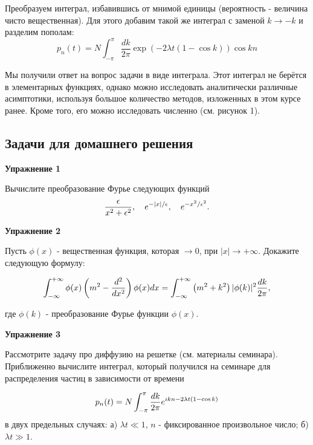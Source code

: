 \documentclass[a4paper,12pt]{article}
\begin{document}
\noindent
Преобразуем интеграл, избавившись от мнимой единицы (вероятность -
величина чисто вещественная). Для этого добавим такой же интеграл
с заменой $k\to-k$ и разделим пополам:
\[
p_{n}(t)=N\int_{-\pi}^{\pi}\frac{dk}{2\pi}\exp(-2\lambda t(1-\cos k))\cos kn
\]


\noindent
Мы получили ответ на вопрос задачи в виде интеграла. Этот интеграл
не берётся в элементарных функциях, однако можно исследовать аналитически
различные асимптотики, используя большое количество методов, изложенных
в этом курсе ранее. Кроме того, его можно исследовать численно (см.
рисунок 1).

\subsection*{Задачи для домашнего решения}

\noindent \textbf{Упражнение 1}

\noindent Вычислите преобразование Фурье следующих функций
\begin{equation}\notag
\frac{\epsilon}{x^{2}+\epsilon^{2}},\quad e^{-|x|/\epsilon},\quad e^{-x^{2}/\epsilon^{2}}.
\end{equation}

\vspace{15pt}
\noindent \textbf{Упражнение 2}

\noindent Пусть $\phi(x)$ - вещественная функция, которая $\rightarrow 0$, при $|x|\rightarrow+\infty$. Докажите следующую формулу:

\begin{equation}\notag
\int_{-\infty}^{+\infty}\phi(x)\left(m^{2}-\frac{d^{2}}{dx^{2}}\right)\phi(x)dx=\int_{-\infty}^{+\infty}\left(m^{2}+k^{2}\right)|\phi(k)|^{2}\frac{dk}{2\pi},
\end{equation}

\noindent где $\phi(k)$ - преобразование Фурье функции $\phi(x)$.

\vspace{15pt}
\noindent \textbf{Упражнение 3}

\noindent Рассмотрите задачу про диффузию на решетке (см. материалы семинара). Приближенно вычислите интеграл, который получился на семинаре для распределения частиц в зависимости от времени

\begin{equation} \notag p_{n}(t)	=N\int_{-\pi}^{\pi}\frac{dk}{2\pi}e^{ikn-2\lambda t(1-\cos k)}
\end{equation}
\noindent в двух предельных случаях: а) $\lambda t\ll 1$, $n$ - фиксированное произвольное число; б) $\lambda t\gg1$.
\end{document}
